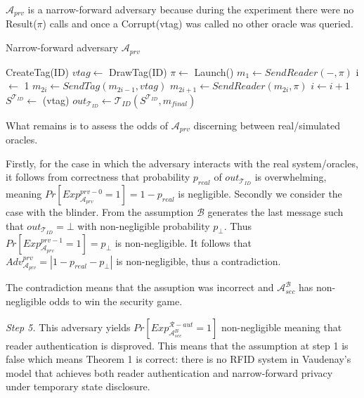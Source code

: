     $\mathcal{A}_{prv}$ is a narrow-forward adversary because during the experiment there were no Result($\pi$) calls and once a Corrupt(vtag) was called 
    no other oracle was queried.

    \begin{algorithm}[H] %
        \centering
        \caption{Narrow-forward adversary $\mathcal{A}_{prv}$}
        \begin{algorithmic}[1] %
            \State CreateTag(ID)
            \State $vtag \leftarrow$ DrawTag(ID)
            \State $\pi \leftarrow$ Launch() 
            \State $m_1 \leftarrow SendReader(-,\pi)$ 
            \State i $\leftarrow$ 1
                \State $m_{2i} \gets SendTag(m_{2i-1}, vtag)$ 
                \State $m_{2i+1} \gets SendReader(m_{2i}, \pi)$
                \State $i \gets i+1$
            \EndWhile
            \State $S^{\mathcal{T}_{ID}} \gets$ (vtag)
            \State $out_{\mathcal{T}_{ID}} \gets \mathcal{T}_{ID}(S^{\mathcal{T}_{ID}}, m_{final})$
                \State {}
            \Else
                \State {}
            \EndIf
        \end{algorithmic}
    \end{algorithm}

    What remains is to assess the odds of $\mathcal{A}_{prv}$ discerning between real/simulated oracles.

    Firstly, for the case in which the adversary interacts with the real system/oracles, it follows from correctness that probability $p_{real}$ of 
    $out_{\mathcal{T}_{ID}}$ is overwhelming, meaning $Pr[Exp_{\mathcal{A}_{prv}}^{prv-0} = 1] = 1-p_{real}$ is negligible. Secondly we consider the case
    with the blinder. From the assumption $\mathcal{B}$ generates the last message such that $out_{\mathcal{T}_{ID}} = \bot$ with non-negligible probability $p_{\bot}$.
    Thus $Pr[Exp_{\mathcal{A}_{prv}}^{prv-1} = 1] = p_{\bot}$ is non-negligible. It follows that $Adv_{\mathcal{A}_{prv}}^{prv} = |1-p_{real}-p_{\bot}|$ is non-negligible,
    thus a contradiction. 

    The contradiction means that the assuption was incorrect and $\mathcal{A}_{sec}^{\mathcal{B}}$ has non-negligible odds to win the security game.

    \textit{Step 5.} This adversary yields $Pr[Exp_{\mathcal{A}_{sec}^{B}}^{\mathcal{R}-aut} = 1]$ non-negligible meaning that reader authentication is disproved. 
    This means that the assumption at step 1 is false which means Theorem 1 is correct: there is no RFID system in Vaudenay's model that achieves both reader authentication and narrow-forward privacy 
    under temporary state disclosure.

